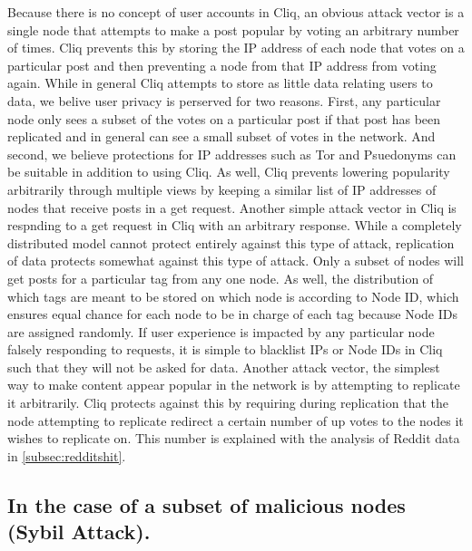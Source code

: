 \documentclass{sig-alternate}
\begin{document}
Because there is no concept of user accounts in Cliq, an obvious attack vector is a single node that attempts to make a post popular by voting an arbitrary number of times. 
Cliq prevents this by storing the IP address of each node that votes on a particular post and then preventing a node from that IP address from voting again. 
While in general Cliq attempts to store as little data relating users to data, we belive user privacy is perserved for two reasons.
First, any particular node only sees a subset of the votes on a particular post if that post has been replicated and in general can see a small subset of votes in the network. 
And second, we believe protections for IP addresses such as Tor and Psuedonyms can be suitable in addition to using Cliq. 
As well, Cliq prevents lowering popularity arbitrarily through multiple views by keeping a similar list of IP addresses of nodes that receive posts in a get request. 
Another simple attack vector in Cliq is respnding to a get request in Cliq with an arbitrary response. 
While a completely distributed model cannot protect entirely against this type of attack, replication of data protects somewhat against this type of attack. 
Only a subset of nodes will get posts for a particular tag from any one node. 
As well, the distribution of which tags are meant to be stored on which node is according to Node ID, which ensures equal chance for each node to be in charge of each tag because Node IDs are assigned randomly. 
If user experience is impacted by any particular node falsely responding to requests, it is simple to blacklist IPs or Node IDs in Cliq such that they will not be asked for data. 
Another attack vector, the simplest way to make content appear popular in the network is by attempting to replicate it arbitrarily. 
Cliq protects against this by requiring during replication that the node attempting to replicate redirect a certain number of up votes to the nodes it wishes to replicate on. 
This number is explained with the analysis of Reddit data in \ref{subsec:redditshit}. 

\subsection{In the case of a subset of malicious nodes (Sybil Attack).}
\label{subsec:spammulti}
\end{document}
